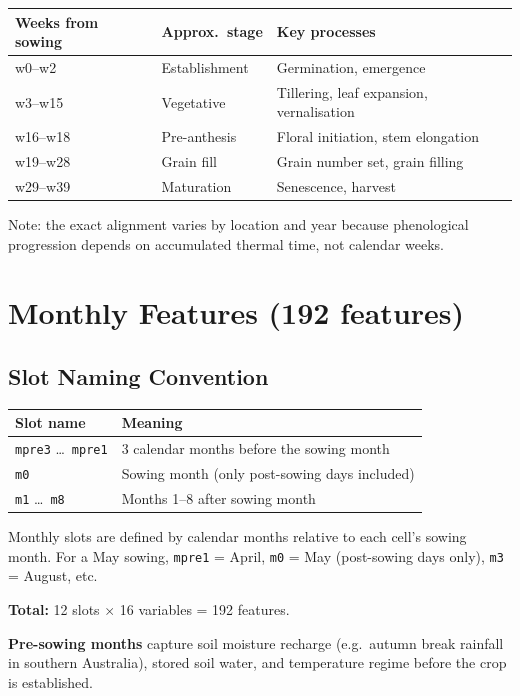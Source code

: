 \documentclass[11pt,a4paper]{article}
\begin{document}
\begin{tabular}{lll}
\toprule
\textbf{Weeks from sowing} & \textbf{Approx.\ stage} & \textbf{Key processes} \\
\midrule
w0--w2 & Establishment & Germination, emergence \\
w3--w15 & Vegetative & Tillering, leaf expansion, vernalisation \\
w16--w18 & Pre-anthesis & Floral initiation, stem elongation \\
w19--w28 & Grain fill & Grain number set, grain filling \\
w29--w39 & Maturation & Senescence, harvest \\
\bottomrule
\end{tabular}

\medskip
\noindent Note: the exact alignment varies by location and year because phenological progression depends on accumulated thermal time, not calendar weeks.

\section{Monthly Features (192 features)}

\subsection{Slot Naming Convention}

\begin{tabular}{ll}
\toprule
\textbf{Slot name} & \textbf{Meaning} \\
\midrule
\texttt{mpre3} \ldots\ \texttt{mpre1} & 3 calendar months before the sowing month \\
\texttt{m0} & Sowing month (only post-sowing days included) \\
\texttt{m1} \ldots\ \texttt{m8} & Months 1--8 after sowing month \\
\bottomrule
\end{tabular}

\medskip
Monthly slots are defined by calendar months relative to each cell's sowing month. For a May sowing, \texttt{mpre1} = April, \texttt{m0} = May (post-sowing days only), \texttt{m3} = August, etc.

\textbf{Total:} 12 slots $\times$ 16 variables = 192 features.

\textbf{Pre-sowing months} capture soil moisture recharge (e.g.\ autumn break rainfall in southern Australia), stored soil water, and temperature regime before the crop is established.
\end{document}
